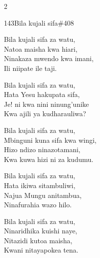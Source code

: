\documentclass{article}
\begin{document}
\begin{multicols}{2}
\begin{hymn}{143}{Bila kujali sifa}{\#408}
\begin{stanza}
Bila kujali sifa za watu,\\
Natoa maisha kwa hiari,\\
Ninakaza mwendo kwa imani,\\
Ili niipate ile taji.
\end{stanza}
\begin{stanza}
Bila kujali sifa za watu,\\
Hata Yesu hakupata sifa,\\
Je! ni kwa nini ninung'unike\\
Kwa ajili ya kudharauliwa?
\end{stanza}
\begin{stanza}
Bila kujali sifa za watu,\\
Mbinguni kuna sifa kwa wingi,\\
Hizo ndizo ninazotamani,\\
Kwa kuwa hizi ni za kudumu.
\end{stanza}
\begin{stanza}
Bila kujali sifa za watu,\\
Hata ikiwa sitambuliwi,\\
Najua Mungu anitambua,\\
Ninafurahia wazo hilo.
\end{stanza}
\begin{stanza}
Bila kujali sifa za watu,\\
Ninaridhika kuishi naye,\\
Nitazidi kutoa maisha,\\
Kwani nitayapokea tena.
\end{stanza}
\end{hymn}


\end{multicols}
\end{document}
